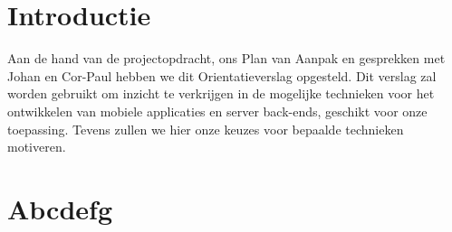 \section{Introductie}

Aan de hand van de projectopdracht, ons Plan van Aanpak en gesprekken met Johan en Cor-Paul hebben we dit Orientatieverslag opgesteld. Dit verslag zal worden gebruikt om inzicht te verkrijgen in de mogelijke technieken voor het ontwikkelen van mobiele applicaties en server back-ends, geschikt voor onze toepassing. Tevens zullen we hier onze keuzes voor bepaalde technieken motiveren.

\section{Abcdefg}
\label{sec:alphabet}
